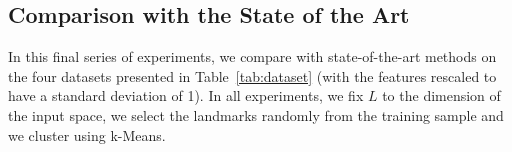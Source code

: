 \subsection{Comparison with the State of the Art}
In this final series of experiments, we compare \landSVM with state-of-the-art methods on the four datasets presented in Table~\ref{tab:dataset} (with the features rescaled to have a standard deviation of 1).
In all experiments, we fix $L$ to the dimension of the input space, we select the landmarks randomly from the training sample and we cluster using k-Means.

\begin{table}
    \centering
    \caption{Characteristics of Datasets}
    \label{tab:dataset}
\end{table}

\begin{table*}[h!]
    \centering
    \caption{Testing Accuracies (\%)}
    \label{tab:accuracy}
\end{table*}

